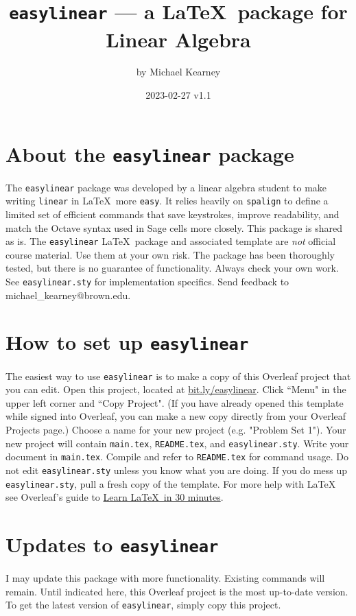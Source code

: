 \documentclass{article}
\title{\texttt{easylinear} --- a \LaTeX\ package for Linear Algebra}
\author{by Michael Kearney}
\date{2023-02-27 v1.1}
\begin{document}
\maketitle

\section{About the \texttt{easylinear} package}
The \texttt{easylinear} package was developed by a linear algebra student to make writing \texttt{linear} in \LaTeX\ more \texttt{easy}. It relies heavily on \texttt{spalign} to define a limited set of efficient commands that save keystrokes, improve readability, and match the Octave syntax used in Sage cells more closely. This package is shared as is. The \texttt{easylinear} \LaTeX\ package and associated template are \emph{not} official course material. Use them at your own risk. The package has been thoroughly tested, but there is no guarantee of functionality. Always check your own work. See \texttt{easylinear.sty} for implementation specifics. Send feedback to michael\_kearney@brown.edu.

\section{How to set up \texttt{easylinear}}
The easiest way to use \texttt{easylinear} is to make a copy of this Overleaf project that you can edit. Open this project, located at \href{http://bit.ly/easylinear}{bit.ly/easylinear}. Click ``Menu" in the upper left corner and ``Copy Project". (If you have already opened this template while signed into Overleaf, you can make a new copy directly from your Overleaf Projects page.) Choose a name for your new project (e.g. "Problem Set 1"). Your new project will contain \texttt{main.tex}, \texttt{README.tex}, and \texttt{easylinear.sty}. Write your document in \texttt{main.tex}. Compile and refer to \texttt{README.tex} for command usage. Do not edit \texttt{easylinear.sty} unless you know what you are doing. If you do mess up \texttt{easylinear.sty}, pull a fresh copy of the template. For more help with \LaTeX\, see Overleaf's guide to \href{https://www.overleaf.com/learn/latex/Learn_LaTeX_in_30_minutes}{Learn \LaTeX\ in 30 minutes}.

\section{Updates to \texttt{easylinear}}
I may update this package with more functionality. Existing commands will remain. Until indicated here, this Overleaf project is the most up-to-date version. To get the latest version of \texttt{easylinear}, simply copy this project.
\end{document}
